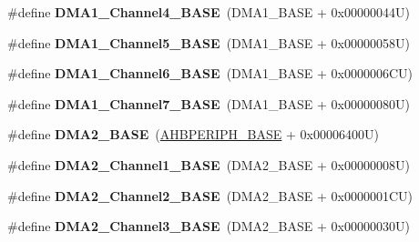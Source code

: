 \begin{DoxyCompactItemize}
\item 
\hypertarget{group___peripheral__memory__map_ga1adc93cd0baf0897202c71110e045692}{\#define {\bfseries D\-M\-A1\-\_\-\-Channel4\-\_\-\-B\-A\-S\-E}~(D\-M\-A1\-\_\-\-B\-A\-S\-E + 0x00000044\-U)}\label{group___peripheral__memory__map_ga1adc93cd0baf0897202c71110e045692}

\item 
\hypertarget{group___peripheral__memory__map_gac041a71cd6c1973964f847a68aa14478}{\#define {\bfseries D\-M\-A1\-\_\-\-Channel5\-\_\-\-B\-A\-S\-E}~(D\-M\-A1\-\_\-\-B\-A\-S\-E + 0x00000058\-U)}\label{group___peripheral__memory__map_gac041a71cd6c1973964f847a68aa14478}

\item 
\hypertarget{group___peripheral__memory__map_ga896c2c7585dd8bc3969cf8561f689d2d}{\#define {\bfseries D\-M\-A1\-\_\-\-Channel6\-\_\-\-B\-A\-S\-E}~(D\-M\-A1\-\_\-\-B\-A\-S\-E + 0x0000006\-C\-U)}\label{group___peripheral__memory__map_ga896c2c7585dd8bc3969cf8561f689d2d}

\item 
\hypertarget{group___peripheral__memory__map_gaeee0d1f77d0db1db533016a09351166c}{\#define {\bfseries D\-M\-A1\-\_\-\-Channel7\-\_\-\-B\-A\-S\-E}~(D\-M\-A1\-\_\-\-B\-A\-S\-E + 0x00000080\-U)}\label{group___peripheral__memory__map_gaeee0d1f77d0db1db533016a09351166c}

\item 
\hypertarget{group___peripheral__memory__map_gab72a9ae145053ee13d1d491fb5c1df64}{\#define {\bfseries D\-M\-A2\-\_\-\-B\-A\-S\-E}~(\hyperlink{group___peripheral__memory__map_ga92eb5d49730765d2abd0f5b09548f9f5}{A\-H\-B\-P\-E\-R\-I\-P\-H\-\_\-\-B\-A\-S\-E} + 0x00006400\-U)}\label{group___peripheral__memory__map_gab72a9ae145053ee13d1d491fb5c1df64}

\item 
\hypertarget{group___peripheral__memory__map_gad3bd6c4201d12f5d474518c1b02f8e3b}{\#define {\bfseries D\-M\-A2\-\_\-\-Channel1\-\_\-\-B\-A\-S\-E}~(D\-M\-A2\-\_\-\-B\-A\-S\-E + 0x00000008\-U)}\label{group___peripheral__memory__map_gad3bd6c4201d12f5d474518c1b02f8e3b}

\item 
\hypertarget{group___peripheral__memory__map_ga22f39f23c879c699b88e04a629f69d1c}{\#define {\bfseries D\-M\-A2\-\_\-\-Channel2\-\_\-\-B\-A\-S\-E}~(D\-M\-A2\-\_\-\-B\-A\-S\-E + 0x0000001\-C\-U)}\label{group___peripheral__memory__map_ga22f39f23c879c699b88e04a629f69d1c}

\item 
\hypertarget{group___peripheral__memory__map_ga6f2369b8bc155fb55a28891987605c2c}{\#define {\bfseries D\-M\-A2\-\_\-\-Channel3\-\_\-\-B\-A\-S\-E}~(D\-M\-A2\-\_\-\-B\-A\-S\-E + 0x00000030\-U)}\label{group___peripheral__memory__map_ga6f2369b8bc155fb55a28891987605c2c}


\end{DoxyCompactItemize}

